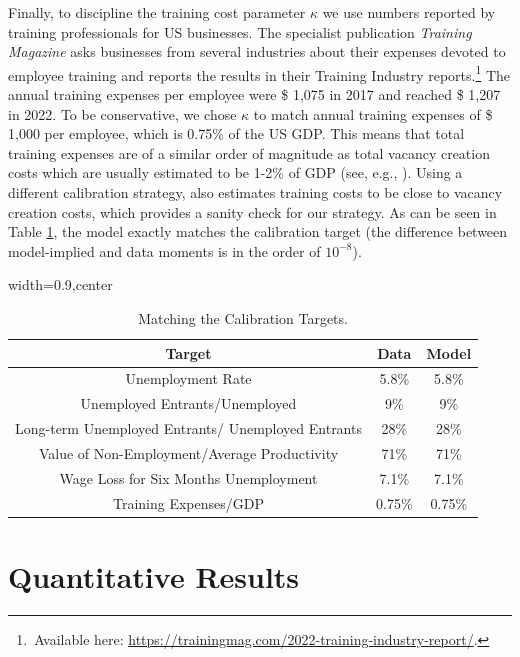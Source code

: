 \documentclass[12pt]{article} %
\theoremstyle{definition}
\begin{document}
Finally, to discipline the training cost parameter $\kappa$ we use numbers reported by training professionals for US businesses.
The specialist publication \textit{Training Magazine} asks businesses from several industries about their expenses devoted to employee training and reports the results in their Training Industry reports.\footnote{\,Available here: \url{https://trainingmag.com/2022-training-industry-report/}.}
The annual training expenses per employee were \$ 1,075 in 2017 and reached \$ 1,207 in 2022.
To be conservative, we chose $\kappa$ to match annual training expenses of \$ 1,000 per employee, which is 0.75\% of the US GDP.
This means that total training expenses are of a similar order of magnitude as total vacancy creation costs which are usually estimated to be 1-2\% of GDP (see, e.g., \cite{michaillat2021beveridgean}).
Using a different calibration strategy, \cite{masui2023provision} also estimates training costs to be close to vacancy creation costs, which provides a sanity check for our strategy.
As can be seen in Table \ref{table_calibration_targets}, the model exactly matches the calibration target (the difference between model-implied and data moments is in the order of $10^{-8}$).


\begin{table}[h!]
\centering
\begin{adjustbox}{width=0.9\columnwidth,center}

 \begin{tabular}{||c c c||} 
 \hline
 \textbf{Target} & \textbf{Data} & \textbf{Model} \\  
 \hline\hline
  Unemployment Rate & 5.8\%  & 5.8\% \\
  Unemployed Entrants/Unemployed & 9\% & 9\%  \\ 
  Long-term Unemployed Entrants/ Unemployed Entrants & 28\% & 28\% \\
  Value of Non-Employment/Average Productivity & 71\% & 71\% \\
  Wage Loss for Six Months Unemployment & 7.1\%  & 7.1\% \\
  Training Expenses/GDP & 0.75\% & 0.75\% \\ [1ex] 
 \hline
 \end{tabular}
\end{adjustbox}
  \caption{Matching the Calibration Targets.} \label{table_calibration_targets}
\end{table} 


\section{Quantitative Results}\label{section results} 
\end{document}
